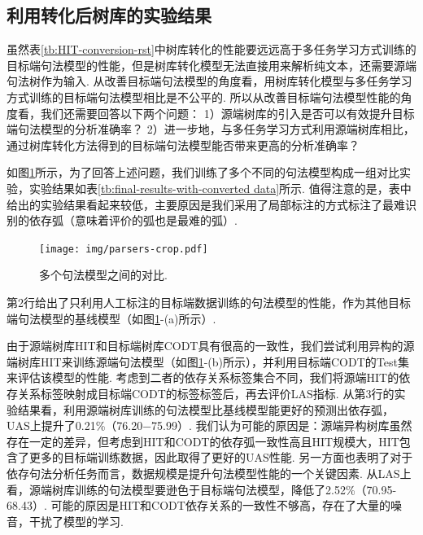 \subsection{利用转化后树库的实验结果}
虽然表\ref{tb:HIT-conversion-rst}中树库转化的性能要远远高于多任务学习方式训练的目标端句法模型的性能，但是树库转化模型无法直接用来解析纯文本，还需要源端句法树作为输入.
从改善目标端句法模型的角度看，用树库转化模型与多任务学习方式训练的目标端句法模型相比是不公平的.
所以从改善目标端句法模型性能的角度看，我们还需要回答以下两个问题：
1）源端树库的引入是否可以有效提升目标端句法模型的分析准确率？
2）进一步地，与多任务学习方式利用源端树库相比，通过树库转化方法得到的目标端句法模型能否带来更高的分析准确率？

如图\ref{fig:parsers}所示，为了回答上述问题，我们训练了多个不同的句法模型构成一组对比实验，实验结果如表\ref{tb:final-results-with-converted data}所示. 值得注意的是，表中给出的实验结果看起来较低，主要原因是我们采用了局部标注的方式标注了最难识别的依存弧（意味着评价的弧也是最难的弧）.
\begin{figure}[hb!]
    \centering
    \texttt{[image: img/parsers-crop.pdf]}
    \caption{多个句法模型之间的对比. }
    \label{fig:parsers}
\end{figure}



第2行给出了只利用人工标注的目标端数据训练的句法模型的性能，作为其他目标端句法模型的基线模型（如图\ref{fig:parsers}-(a)所示）.

由于源端树库HIT和目标端树库CODT具有很高的一致性，我们尝试利用异构的源端树库HIT来训练源端句法模型（如图\ref{fig:parsers}-(b)所示），并利用目标端CODT的Test集来评估该模型的性能. 考虑到二者的依存关系标签集合不同，我们将源端HIT的依存关系标签映射成目标端CODT的标签标签后，再去评价LAS指标. 从第3行的实验结果看，利用源端树库训练的句法模型比基线模型能更好的预测出依存弧，UAS上提升了0.21\%（76.20−75.99）. 我们认为可能的原因是：源端异构树库虽然存在一定的差异，但考虑到HIT和CODT的依存弧一致性高且HIT规模大，HIT包含了更多的目标端训练数据，因此取得了更好的UAS性能. 另一方面也表明了对于依存句法分析任务而言，数据规模是提升句法模型性能的一个关键因素. 从LAS上看，源端树库训练的句法模型要逊色于目标端句法模型，降低了2.52\%（70.95-68.43）. 可能的原因是HIT和CODT依存关系的一致性不够高，存在了大量的噪音，干扰了模型的学习.

